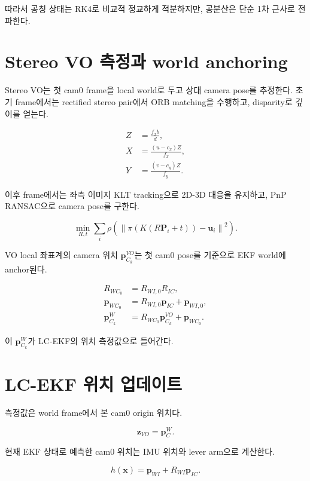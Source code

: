 \documentclass[11pt,a4paper,oneside]{report}
\begin{document}
따라서 공칭 상태는 RK4로 비교적 정교하게 적분하지만, 공분산은 단순 1차 근사로 전파한다.

\section{Stereo VO 측정과 world anchoring}

Stereo VO는 첫 cam0 frame을 local world로 두고 상대 camera pose를 추정한다.
초기 frame에서는 rectified stereo pair에서 ORB matching을 수행하고, disparity로 깊이를 얻는다.

\begin{align}
Z &= \frac{f_x b}{d}, \\
X &= \frac{(u-c_x)Z}{f_x}, \\
Y &= \frac{(v-c_y)Z}{f_y}.
\end{align}

이후 frame에서는 좌측 이미지 KLT tracking으로 2D-3D 대응을 유지하고,
PnP RANSAC으로 camera pose를 구한다.

\begin{equation}
\min_{R,t}
\sum_i
\rho\left(
\left\|
\pi\left(K(R\mathbf{P}_i+t)\right)-\mathbf{u}_i
\right\|^2
\right).
\end{equation}

VO local 좌표계의 camera 위치 \(\mathbf{p}^{VO}_{C_k}\)는 첫 cam0 pose를 기준으로
EKF world에 anchor된다.

\begin{align}
R_{WC_0} &= R_{WI,0}R_{IC}, \\
\mathbf{p}_{WC_0} &= R_{WI,0}\mathbf{p}_{IC} + \mathbf{p}_{WI,0}, \\
\mathbf{p}^{W}_{C_k} &= R_{WC_0}\mathbf{p}^{VO}_{C_k} + \mathbf{p}_{WC_0}.
\end{align}

이 \(\mathbf{p}^{W}_{C_k}\)가 LC-EKF의 위치 측정값으로 들어간다.

\section{LC-EKF 위치 업데이트}

측정값은 world frame에서 본 cam0 origin 위치다.

\begin{equation}
\mathbf{z}_{VO} = \mathbf{p}^{W}_{C}.
\end{equation}

현재 EKF 상태로 예측한 cam0 위치는 IMU 위치와 lever arm으로 계산한다.

\begin{equation}
h(\mathbf{x})
= \mathbf{p}_{WI} + R_{WI}\mathbf{p}_{IC}.
\end{equation}
\end{document}
